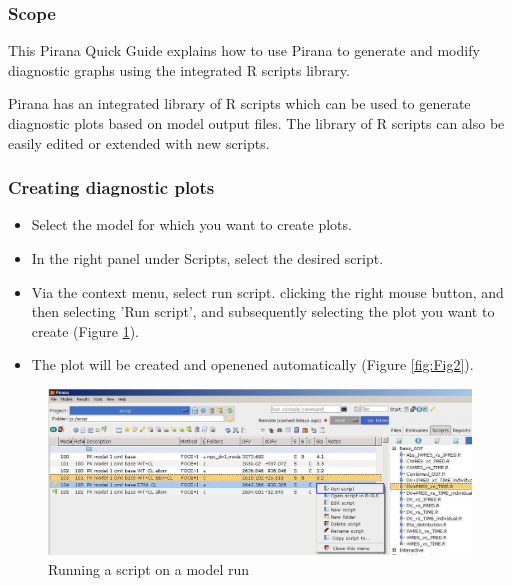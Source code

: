 \begin{center}
   {\colorbox{grey2}{
         \begin{minipage}[t]{0.9\textwidth}
\subsubsection*{Scope}
This Pirana Quick Guide explains how to use Pirana to generate and
modify diagnostic graphs using the integrated R scripts library.
          \end{minipage}
      }
   }
\end{center}

\vspace{10pt}

Pirana has an integrated library of R scripts which can be used to
generate diagnostic plots based on model output files. The library of
R scripts can also be easily edited or extended with new scripts.

\subsubsection*{Creating diagnostic plots}
\begin{itemize}
\item Select the model for which you want to create plots.
\item In the right panel under Scripts, select the desired script.
\item Via the context menu, select run script. 
  clicking the right mouse button, and then selecting 'Run script',
  and subsequently selecting the plot you want to create (Figure \ref{fig:Fig1}).
\item The plot will be created and openened automatically (Figure \ref{fig:Fig2}).
 
\end{itemize}


\begin{figure}[hctb] \centering
    \includegraphics[scale=.3]{images/graphs_1.jpg}
    \caption{Running a script on a model run\label{fig:Fig1}}
\end{figure}

